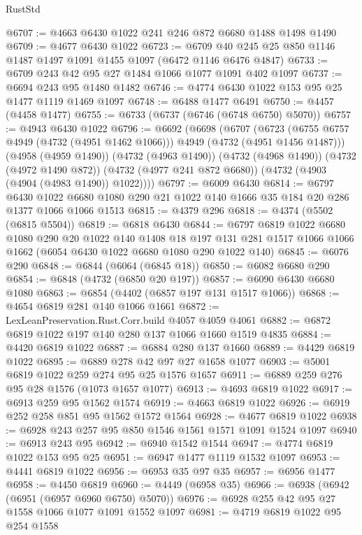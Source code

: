 \begin{lexlean}{RustStd}
\begin{coremodule}
@6707 := @4663 @6430 @1022 @241 @246 @872 @6680 @1488 @1498 @1490
@6709 := @4677 @6430 @1022
@6723 := @6709 @40 @245 @25 @850 @1146 @1487 @1497 @1091 @1455 @1097 (@6472 @1146 @6476 @4847)
@6733 := @6709 @243 @42 @95 @27 @1484 @1066 @1077 @1091 @402 @1097
@6737 := @6694 @243 @95 @1480 @1482
@6746 := @4774 @6430 @1022 @153 @95 @25 @1477 @1119 @1469 @1097
@6748 := @6488 @1477 @6491
@6750 := @4457 (@4458 @1477)
@6755 := @6733 (@6737 (@6746 (@6748 @6750) @5070))
@6757 := @4943 @6430 @1022
@6796 := @6692
    (@6698
      (@6707
        (@6723 (@6755 @6757 @4949 (@4732 (@4951 @1462 @1066))) @4949 (@4732 (@4951 @1456 @1487)))
        (@4958 (@4959 @1490))
        (@4732 (@4963 @1490))
        (@4732 (@4968 @1490))
        (@4732 (@4972 @1490 @872))
        (@4732 (@4977 @241 @872 @6680))
        (@4732 (@4903 (@4904 (@4983 @1490)) @1022))))
@6797 := @6009 @6430
@6814 := @6797
    @6430
    @1022
    @6680
    @1080
    @290
    @21
    @1022
    @140
    @1666
    @35
    @184
    @20
    @286
    @1377
    @1066
    @1066
    @1513
@6815 := @4379 @296
@6818 := @4374 (@5502 (@6815 @5504))
@6819 := @6818 @6430
@6844 := @6797
    @6819
    @1022
    @6680
    @1080
    @290
    @20
    @1022
    @140
    @1408
    @18
    @197
    @131
    @281
    @1517
    @1066
    @1066
    @1662
    (@6054 @6430 @1022 @6680 @1080 @290 @1022 @140)
@6845 := @6076 @290
@6848 := @6844 (@6064 (@6845 @18))
@6850 := @6082 @6680 @290
@6854 := @6848 (@4732 (@6850 @20 @197))
@6857 := @6090 @6430 @6680 @1080
@6863 := @6854 (@4402 (@6857 @197 @131 @1517 @1066))
@6868 := @4654 @6819 @281 @140 @1066 @1661
@6872 := LexLeanPreservation.Rust.Corr.build @4057 @4059 @4061
@6882 := @6872 @6819 @1022 @197 @140 @280 @137 @1066 @1660 @1519 @4835
@6884 := @4420 @6819 @1022
@6887 := @6884 @280 @137 @1660
@6889 := @4429 @6819 @1022
@6895 := @6889 @278 @42 @97 @27 @1658 @1077
@6903 := @5001 @6819 @1022 @259 @274 @95 @25 @1576 @1657
@6911 := @6889 @259 @276 @95 @28 @1576 (@1073 @1657 @1077)
@6913 := @4693 @6819 @1022
@6917 := @6913 @259 @95 @1562 @1574
@6919 := @4663 @6819 @1022
@6926 := @6919 @252 @258 @851 @95 @1562 @1572 @1564
@6928 := @4677 @6819 @1022
@6938 := @6928 @243 @257 @95 @850 @1546 @1561 @1571 @1091 @1524 @1097
@6940 := @6913 @243 @95
@6942 := @6940 @1542 @1544
@6947 := @4774 @6819 @1022 @153 @95 @25
@6951 := @6947 @1477 @1119 @1532 @1097
@6953 := @4441 @6819 @1022
@6956 := @6953 @35 @97 @35
@6957 := @6956 @1477
@6958 := @4450 @6819
@6960 := @4449 (@6958 @35)
@6966 := @6938 (@6942 (@6951 (@6957 @6960 @6750) @5070))
@6976 := @6928 @255 @42 @95 @27 @1558 @1066 @1077 @1091 @1552 @1097
@6981 := @4719 @6819 @1022 @95 @254 @1558

\end{coremodule}
\end{lexlean}
